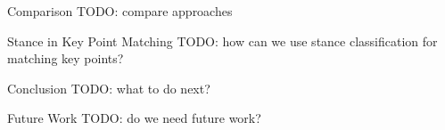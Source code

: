 \documentclass[english,handout]{mlutalk}
\begin{document}
\begin{frame}{Comparison}
  TODO: compare approaches
\end{frame}

\begin{frame}{Stance in Key Point Matching}
  TODO: how can we use stance classification for matching key points?
\end{frame}

\begin{frame}{Conclusion}
  TODO: what to do next?
\end{frame}

\begin{frame}{Future Work}
  TODO: do we need future work?
  \thankyou
\end{frame}

\appendix
\section{\appendixname}

\bibliographyframe
\end{document}
